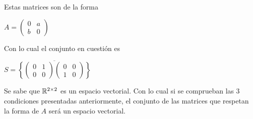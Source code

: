\begin{enumerate}
            \begin{mdframed}[style=s]
                Estas matrices son de la forma 
                \begin{tightcenter}
                    $A=\begin{pmatrix}
                        0&a\\
                        b&0
                    \end{pmatrix}$
                \end{tightcenter}
                Con lo cual el conjunto en cuestión es 
                \begin{tightcenter}
                    $S=\overline{\left\{\begin{pmatrix}
                        0&1\\
                        0&0
                    \end{pmatrix}\begin{pmatrix}
                        0&0\\
                        1&0
                    \end{pmatrix}\right\}}$    
                \end{tightcenter}
                Se sabe que $\mathbb{R}^{2\times2}$ es un espacio vectorial. Con lo cual si se comprueban las 3 condiciones presentadas anteriormente, el conjunto de las matrices que respetan la forma de $A$ será un espacio vectorial.
\end{mdframed}
\end{enumerate}
